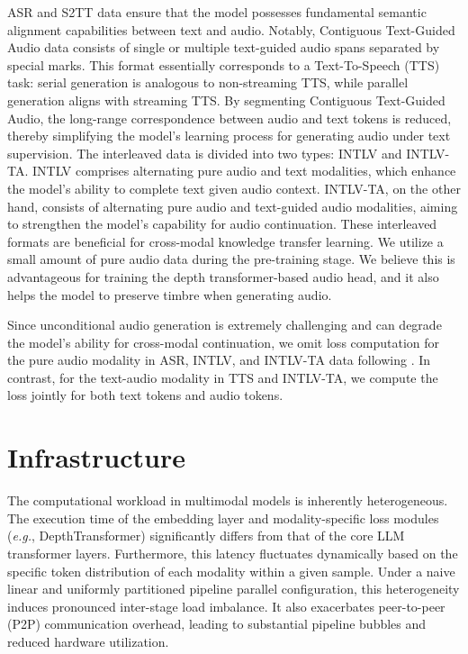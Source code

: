 \documentclass{article}
\begin{document}
ASR and S2TT data ensure that the model possesses fundamental semantic alignment capabilities between text and audio. Notably, Contiguous Text-Guided Audio data consists of single or multiple text-guided audio spans separated by special marks. This format essentially corresponds to a Text-To-Speech (TTS) task: serial generation is analogous to non-streaming TTS, while parallel generation aligns with streaming TTS. By segmenting Contiguous Text-Guided Audio, the long-range correspondence between audio and text tokens is reduced, thereby simplifying the model’s learning process for generating audio under text supervision.
The interleaved data is divided into two types: INTLV and INTLV-TA. INTLV comprises alternating pure audio and text modalities, which enhance the model’s ability to complete text given audio context. INTLV-TA, on the other hand, consists of alternating pure audio and text-guided audio modalities, aiming to strengthen the model’s capability for audio continuation. These interleaved formats are beneficial for cross-modal knowledge transfer learning.
We utilize a small amount of pure audio data during the pre-training stage. We believe this is advantageous for training the depth transformer-based audio head, and it also helps the model to preserve timbre when generating audio.

Since unconditional audio generation is extremely challenging and can degrade the model’s ability for cross-modal continuation, we omit loss computation for the pure audio modality in ASR, INTLV, and INTLV-TA data following \cite{li2025baichuan}. In contrast, for the text-audio modality in TTS and INTLV-TA, we compute the loss jointly for both text tokens and audio tokens.



\section{Infrastructure}

 
The computational workload in multimodal models is inherently heterogeneous. The execution time of the embedding layer and modality-specific loss modules (\textit{e.g.}, DepthTransformer) significantly differs from that of the core LLM transformer layers. Furthermore, this latency fluctuates dynamically based on the specific token distribution of each modality within a given sample. Under a naive linear and uniformly partitioned pipeline parallel configuration, this heterogeneity induces pronounced inter-stage load imbalance. It also exacerbates peer-to-peer (P2P) communication overhead, leading to substantial pipeline bubbles and reduced hardware utilization.
\end{document}
